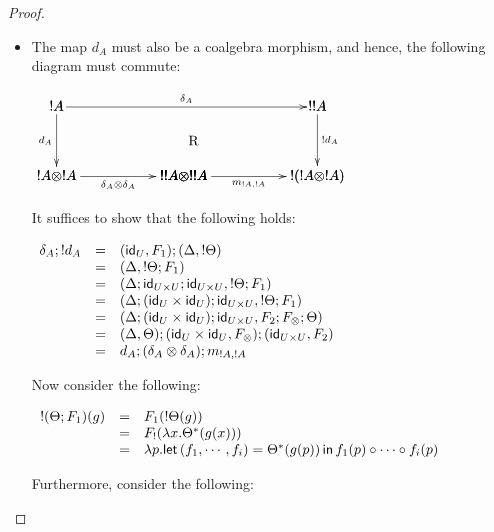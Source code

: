 \begin{proof}
\begin{report}
\begin{itemize}
  \item The map $d_A$ must also be a coalgebra morphism, and hence,
    the following diagram must commute:
    \begin{center}
      \begin{math}
        \bfig
        \morphism(40,500)<1780,0>[`;\delta_{A}]
        \hSquares/``->``->`->`->/[!A``!!A`!A \otimes !A`!!A \otimes !!A`!(!A \otimes !A);``d_A``!d_A`\delta_A \otimes \delta_A`m_{!A,!A}]
        \place(980,250)[\text{R}]        
        \efig                
      \end{math}
    \end{center}
    It suffices to show that the following holds:
    \begin{center}
      \begin{math}
        \begin{array}{lll}
          \delta_A;!d_A
          & = & (\mathsf{id}_U,F_1);(\Delta,!\Theta)\\
          & = & (\Delta,!\Theta;F_1)\\
          & = & (\Delta;\mathsf{id}_{U \times U};\mathsf{id}_{U \times U},!\Theta;F_1)\\
          & = & (\Delta;(\mathsf{id}_{U} \times \mathsf{id}_{U});\mathsf{id}_{U \times U},!\Theta;F_1)\\
          & = & (\Delta;(\mathsf{id}_{U} \times \mathsf{id}_{U});\mathsf{id}_{U \times U},F_2;F_\otimes;\Theta)\\
          & = & (\Delta,\Theta);(\mathsf{id}_{U} \times \mathsf{id}_{U},F_\otimes);(\mathsf{id}_{U \times U},F_2)\\
          & = & d_A;(\delta_A \otimes \delta_A);m_{!A,!A}\\
        \end{array}
      \end{math}
    \end{center}
    Now consider the following:
    \begin{center}
      \begin{math}
        \begin{array}{lll}
          !(\Theta;F_1)(g)
          & = & F_1(!\Theta(g))\\
          & = & F_!(\lambda x.\Theta^*(g(x)))\\
          & = & \lambda p.\mathsf{let}\, (f_1,\cdots,f_i) = \Theta^*(g(p)) \,\mathsf{in}\, f_1(p) \circ \cdots \circ f_i(p)\\          
        \end{array}
      \end{math}
    \end{center}
    Furthermore, consider the following:

\end{itemize}
\end{report}
\end{proof}
